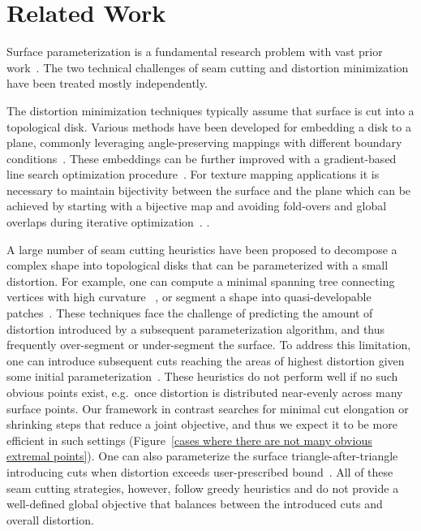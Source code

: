 
\section{Related Work}
Surface parameterization is a fundamental research problem with vast prior work~\cite{Hormann2008}. 
The two technical challenges of seam cutting and distortion minimization have been treated mostly independently. 

The distortion minimization techniques typically assume that surface is cut into a topological disk. Various methods
have been developed for embedding a disk to a plane, commonly leveraging angle-preserving mappings with different
boundary conditions~\cite{Floater2003,Sheffer2005ABFPP,Levy2002,Aigerman2015,Sawhney:2017}. 
These embeddings can be further improved with a gradient-based line search optimization procedure~\cite{Hormann2000MIPS,Rabinovich2017,Zhu2017BCQN,Shtengel:GOvCM:2017,claici2017isometry}. 
For texture mapping applications it is necessary to maintain bijectivity between the surface and the plane 
which can be achieved by starting with a bijective map and avoiding fold-overs and global overlaps during iterative optimization~\cite{Smith2015Bijective,Jiang2017Simplicial}.
%
.

A large number of seam cutting heuristics have been proposed to decompose a complex shape into topological disks that can be
parameterized with a small distortion. For example, one can compute a minimal spanning tree connecting vertices with high curvature
~\cite{Sheffer2002Seamster}, or segment a shape into quasi-developable patches~\cite{Julius2005D}. These 
techniques face the challenge of predicting the amount of distortion introduced by a subsequent parameterization algorithm,
and thus frequently over-segment or under-segment the surface. 
%
To address this limitation, one can introduce subsequent cuts reaching the areas of highest distortion given some initial parameterization~\cite{Gu2002Geometry}.
%
These heuristics do not perform well if no such obvious points exist, e.g.\ once distortion is distributed near-evenly across many surface points. Our framework in contrast searches for minimal cut elongation or shrinking steps that reduce a joint objective, and thus we expect it to be more efficient in such settings (Figure~\ref{cases where there are not many obvious extremal points}).
%
One can also parameterize the surface triangle-after-triangle introducing cuts when distortion exceeds user-prescribed bound~\cite{BoundedDistortParam:2002}. 
%
All of these seam cutting strategies, however, follow greedy heuristics and do not provide a well-defined global objective that balances between the introduced cuts and overall distortion. 

